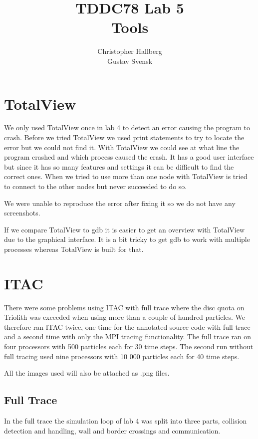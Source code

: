 \documentclass[a4paper, 12pt]{article}
\begin{document}
\title{TDDC78 Lab 5\\
        Tools }
\author{Christopher Hallberg \\
        Gustav Svensk}
\maketitle

\thispagestyle{empty}

\newpage
\setcounter{page}{1}
\tableofcontents
\newpage

\section{TotalView}
We only used TotalView once in lab 4 to detect an error causing the program to
crash. Before we tried TotalView we used print statements to try to locate the
error but we could not find it. With TotalView we could see at what line the
program crashed and which process caused the crash. It has a good user interface
but since it has so many features and settings it can be difficult to find the
correct ones. When we tried to use more than one node with TotalView is tried to
connect to the other nodes but never succeeded to do so.

We were unable to reproduce the error after fixing it so we do not have any
screenshots.

If we compare TotalView to gdb it is easier to get an overview with TotalView
due to the graphical interface. It is a bit tricky to get gdb to work with
multiple processes whereas TotalView is built for that.

\section{ITAC}
There were some problems using ITAC with full trace where the disc quota on Triolith
was exceeded when using more than a couple of hundred particles. We therefore
ran ITAC twice, one time for the annotated source code with full trace and a
second time with only the MPI tracing functionality. The full trace ran on
four processors with 500 particles each for 30 time steps. The second run without
full tracing used nine processors with 10 000 particles each for 40 time steps.

All the images used will also be attached as .png files.

\subsection{Full Trace}
In the full trace the simulation loop of lab 4 was split into three parts,
collision detection and handling, wall and border crossings and communication. 
\end{document}
